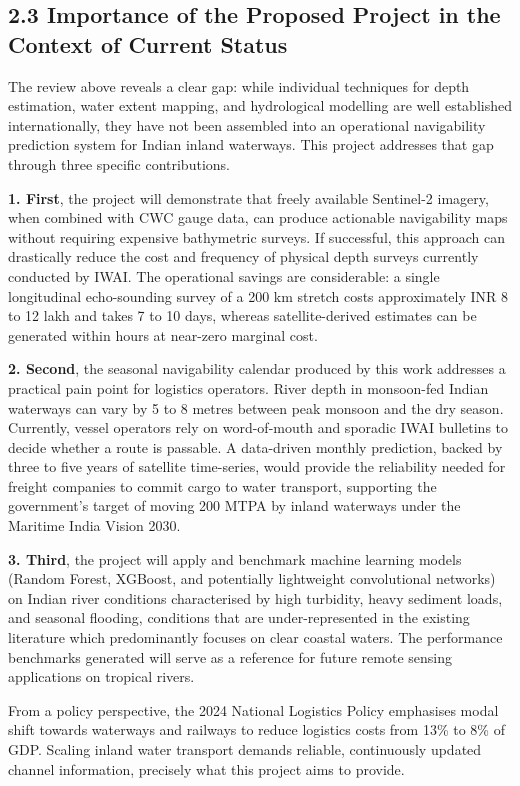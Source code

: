 \documentclass[12pt,a4paper]{article}
\begin{document}
\newpage
\subsection*{2.3 Importance of the Proposed Project in the Context of Current Status}

The review above reveals a clear gap: while individual techniques for depth estimation, water extent mapping, and hydrological modelling are well established internationally, they have not been assembled into an operational navigability prediction system for Indian inland waterways. This project addresses that gap through three specific contributions.

\textbf{1. First}, the project will demonstrate that freely available Sentinel-2 imagery, when combined with CWC gauge data, can produce actionable navigability maps without requiring expensive bathymetric surveys. If successful, this approach can drastically reduce the cost and frequency of physical depth surveys currently conducted by IWAI. The operational savings are considerable: a single longitudinal echo-sounding survey of a 200 km stretch costs approximately INR 8 to 12 lakh and takes 7 to 10 days, whereas satellite-derived estimates can be generated within hours at near-zero marginal cost.

\textbf{2. Second}, the seasonal navigability calendar produced by this work addresses a practical pain point for logistics operators. River depth in monsoon-fed Indian waterways can vary by 5 to 8 metres between peak monsoon and the dry season. Currently, vessel operators rely on word-of-mouth and sporadic IWAI bulletins to decide whether a route is passable. A data-driven monthly prediction, backed by three to five years of satellite time-series, would provide the reliability needed for freight companies to commit cargo to water transport, supporting the government's target of moving 200 MTPA by inland waterways under the Maritime India Vision 2030.

\textbf{3. Third}, the project will apply and benchmark machine learning models (Random Forest, XGBoost, and potentially lightweight convolutional networks) on Indian river conditions characterised by high turbidity, heavy sediment loads, and seasonal flooding, conditions that are under-represented in the existing literature which predominantly focuses on clear coastal waters. The performance benchmarks generated will serve as a reference for future remote sensing applications on tropical rivers.

From a policy perspective, the 2024 National Logistics Policy emphasises modal shift towards waterways and railways to reduce logistics costs from 13\% to 8\% of GDP. Scaling inland water transport demands reliable, continuously updated channel information, precisely what this project aims to provide.
\end{document}
